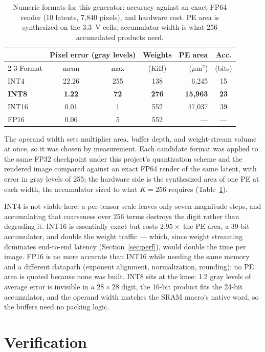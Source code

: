 \documentclass[conference,a4paper]{APSIPA2026}
\begin{document}
\begin{table}[!ht]
\caption{Numeric formats for this generator: accuracy against an exact FP64 render (10 latents, 7{,}840 pixels), and hardware cost. PE area is synthesized on the 3.3~V cells; accumulator width is what 256 accumulated products need.}
\label{tab:format}
\centering
\renewcommand{\arraystretch}{1.08}
\begin{tabular}{@{}lcccrc@{}}
\toprule
 & \multicolumn{2}{c}{Pixel error (gray levels)} & Weights & PE area & Acc. \\
\cmidrule(lr){2-3}
Format & mean & max & (KiB) & ($\mu$m$^2$) & (bits) \\
\midrule
INT4   & 22.26 & 255 & 138 & 6{,}245  & 15 \\
\textbf{INT8}  & \textbf{1.22} & \textbf{72} & \textbf{276} & \textbf{15{,}963} & \textbf{23} \\
INT16  & 0.01  & 1   & 552 & 47{,}037 & 39 \\
FP16   & 0.06  & 5   & 552 & ---      & --- \\
\bottomrule
\end{tabular}
\end{table}
The operand width sets multiplier area, buffer depth, and weight-stream volume at once, so it was chosen by measurement. Each candidate format was applied to the same FP32 checkpoint under this project's quantization scheme and the rendered image compared against an exact FP64 render of the same latent, with error in gray levels of 255; the hardware side is the synthesized area of one PE at each width, the accumulator sized to what $K=256$ requires (Table~\ref{tab:format}).

INT4 is not viable here: a per-tensor scale leaves only seven magnitude steps, and accumulating that coarseness over 256 terms destroys the digit rather than degrading it. INT16 is essentially exact but costs $2.95\times$ the PE area, a 39-bit accumulator, and double the weight traffic --- which, since weight streaming dominates end-to-end latency (Section~\ref{sec:perf}), would double the time per image. FP16 is no more accurate than INT16 while needing the same memory and a different datapath (exponent alignment, normalization, rounding); no PE area is quoted because none was built. INT8 sits at the knee: 1.2 gray levels of average error is invisible in a $28\times28$ digit, the 16-bit product fits the 24-bit accumulator, and the operand width matches the SRAM macro's native word, so the buffers need no packing logic.

\section{Verification}\label{sec:map}
\end{document}
